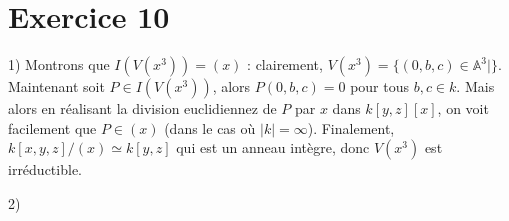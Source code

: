     \section{Exercice 10}
        \begin{question}{1)}
            Montrons que $I(V(x^3)) = (x)$ : clairement, $V(x^3) = \{(0,b,c) \in \mathbb{A}^3 \mid \}$. Maintenant soit $P \in I(V(x^3))$, alors $P(0,b,c) = 0$ pour tous $b,c \in k$. Mais alors en réalisant la division euclidiennez de $P$ par $x$ dans $k[y,z][x]$, on voit facilement que $P \in (x)$ (dans le cas où $|k| = \infty$). Finalement, $k[x,y,z]/(x) \simeq k[y,z]$ qui est un anneau intègre, donc $V(x^3)$ est irréductible.
        \end{question}
        \begin{question}{2)}
        \end{question}
